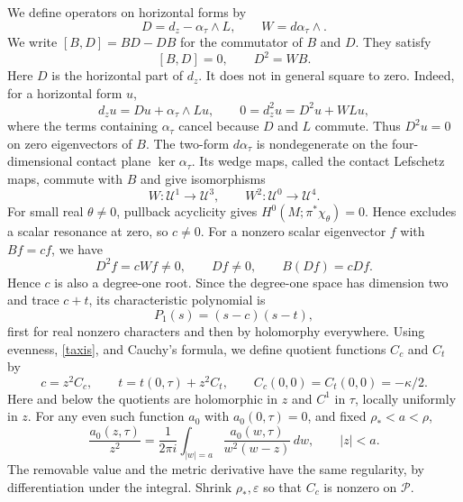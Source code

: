 \documentclass[11pt,letterpaper,reqno]{amsart}
\theoremstyle{remark}
\newcommand{\cU}{\mathcal U}
\begin{document}
We define operators on horizontal forms by
\[
 D=d_z-\alpha_\tau\wedge L,\qquad W=d\alpha_\tau\wedge.
\]
We write $[B,D]=BD-DB$ for the commutator of $B$ and $D$.
They satisfy
\begin{equation}\label{Cartan}
 [B,D]=0,\qquad D^2=WB.
\end{equation}
Here $D$ is the horizontal part of $d_z$. It does not in general
square to zero. Indeed, for a horizontal form $u$,
\[
 d_zu=Du+\alpha_\tau\wedge Lu,\qquad
 0=d_z^2u=D^2u+WLu,
\]
where the terms containing $\alpha_\tau$ cancel because $D$ and $L$
commute. Thus $D^2u=0$ on zero eigenvectors of $B$.
The two-form $d\alpha_\tau$ is nondegenerate on the four-dimensional
contact plane $\ker\alpha_\tau$. Its wedge maps, called the contact
Lefschetz maps, commute with $B$ and give isomorphisms
\[
 W:\cU^1\longrightarrow\cU^3,\qquad
 W^2:\cU^0\longrightarrow\cU^4.
\]
For small real $\theta\ne0$, pullback acyclicity gives
$H^0(M;\pi^*\chi_\theta)=0$. Hence \cite[Lemma~7.4]{DGRS}
excludes a scalar resonance at zero, so $c\ne0$. For a nonzero scalar
eigenvector $f$ with $Bf=cf$, we have
\[
 D^2f=cWf\ne0,\qquad Df\ne0,\qquad B(Df)=cDf.
\]
Hence $c$ is also a degree-one root. Since the degree-one space has
dimension two and trace $c+t$, its characteristic polynomial is
\begin{equation}\label{P1}
 P_1(s)=(s-c)(s-t),
\end{equation}
first for real nonzero characters and then by holomorphy everywhere.
Using evenness, \eqref{taxis}, and Cauchy's formula, we define quotient
functions $C_c$ and $C_t$ by
\begin{equation}\label{ctfactors}
 c=z^2C_c,\qquad t=t(0,\tau)+z^2C_t,
 \qquad C_c(0,0)=C_t(0,0)=-\kappa/2.
\end{equation}
Here and below the quotients are holomorphic in $z$ and $C^1$ in
$\tau$, locally uniformly in $z$. For any even such function $a_0$ with
$a_0(0,\tau)=0$, and fixed $\rho_*<a<\rho$,
\begin{equation}\label{Cauchyquotient}
 \frac{a_0(z,\tau)}{z^2}
 =\frac1{2\pi i}\int_{|w|=a}
       \frac{a_0(w,\tau)}{w^2(w-z)}\,dw,\qquad |z|<a.
\end{equation}
The removable value and the metric derivative have the same regularity,
by differentiation under the integral. Shrink $\rho_*,\varepsilon$ so that $C_c$ is
nonzero on $\mathcal P$.
\end{document}
